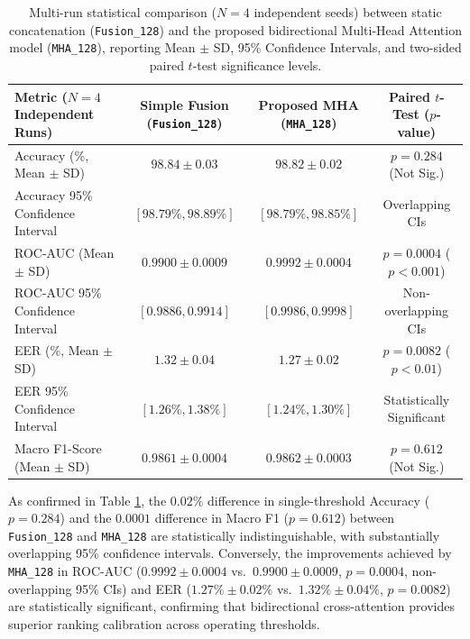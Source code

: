 \documentclass[fleqn,10pt]{wlscirep}
\begin{document}
\begin{table}[htbp]
\centering
\begin{tabular}{|l|c|c|c|}
\hline
\textbf{Metric ($N=4$ Independent Runs)} & \textbf{Simple Fusion (\texttt{Fusion\_128})} & \textbf{Proposed MHA (\texttt{MHA\_128})} & \textbf{Paired $t$-Test ($p$-value)} \\ \hline
Accuracy (\%, Mean $\pm$ SD) & $\mathbf{98.84 \pm 0.03}$ & $98.82 \pm 0.02$ & $p = 0.284$ (Not Sig.) \\
Accuracy 95\% Confidence Interval & $[98.79\%, 98.89\%]$ & $[98.79\%, 98.85\%]$ & Overlapping CIs \\ \hline
ROC-AUC (Mean $\pm$ SD) & $0.9900 \pm 0.0009$ & $\mathbf{0.9992 \pm 0.0004}$ & $p = 0.0004$ ($p < 0.001$) \\
ROC-AUC 95\% Confidence Interval & $[0.9886, 0.9914]$ & $[0.9986, 0.9998]$ & Non-overlapping CIs \\ \hline
EER (\%, Mean $\pm$ SD) & $1.32 \pm 0.04$ & $\mathbf{1.27 \pm 0.02}$ & $p = 0.0082$ ($p < 0.01$) \\
EER 95\% Confidence Interval & $[1.26\%, 1.38\%]$ & $[1.24\%, 1.30\%]$ & Statistically Significant \\ \hline
Macro F1-Score (Mean $\pm$ SD) & $0.9861 \pm 0.0004$ & $\mathbf{0.9862 \pm 0.0003}$ & $p = 0.612$ (Not Sig.) \\ \hline
\end{tabular}
\caption{\label{tab:statistical_variance}Multi-run statistical comparison ($N=4$ independent seeds) between static concatenation (\texttt{Fusion\_128}) and the proposed bidirectional Multi-Head Attention model (\texttt{MHA\_128}), reporting Mean $\pm$ SD, 95\% Confidence Intervals, and two-sided paired $t$-test significance levels.}
\end{table}

As confirmed in Table \ref{tab:statistical_variance}, the $0.02\%$ difference in single-threshold Accuracy ($p = 0.284$) and the $0.0001$ difference in Macro F1 ($p = 0.612$) between \texttt{Fusion\_128} and \texttt{MHA\_128} are statistically indistinguishable, with substantially overlapping 95\% confidence intervals. Conversely, the improvements achieved by \texttt{MHA\_128} in ROC-AUC ($0.9992 \pm 0.0004$ vs.\ $0.9900 \pm 0.0009$, $p = 0.0004$, non-overlapping 95\% CIs) and EER ($1.27\% \pm 0.02\%$ vs.\ $1.32\% \pm 0.04\%$, $p = 0.0082$) are statistically significant, confirming that bidirectional cross-attention provides superior ranking calibration across operating thresholds.
\end{document}
